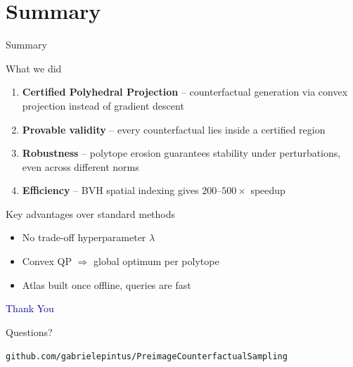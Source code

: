 \documentclass[aspectratio=169, 11pt]{beamer}
\begin{document}
\section{Summary}

\begin{frame}{Summary}

\begin{block}{What we did}
\begin{enumerate}
  \item \textbf{Certified Polyhedral Projection} -- counterfactual generation via convex projection instead of gradient descent
  \item \textbf{Provable validity} -- every counterfactual lies inside a certified region
  \item \textbf{Robustness} -- polytope erosion guarantees stability under perturbations, even across different norms
  \item \textbf{Efficiency} -- BVH spatial indexing gives $200$--$500\times$ speedup
\end{enumerate}
\end{block}

\bigskip

\begin{block}{Key advantages over standard methods}
\begin{itemize}
  \item No trade-off hyperparameter $\lambda$
  \item Convex QP $\Rightarrow$ global optimum per polytope
  \item Atlas built once offline, queries are fast
\end{itemize}
\end{block}

\end{frame}

\begin{frame}

\begin{center}
  {\Huge\textcolor{darkblue}{Thank You}}

  \bigskip

  {\large Questions?}

  \bigskip\bigskip

  \texttt{github.com/gabrielepintus/PreimageCounterfactualSampling}
\end{center}

\end{frame}
\end{document}

